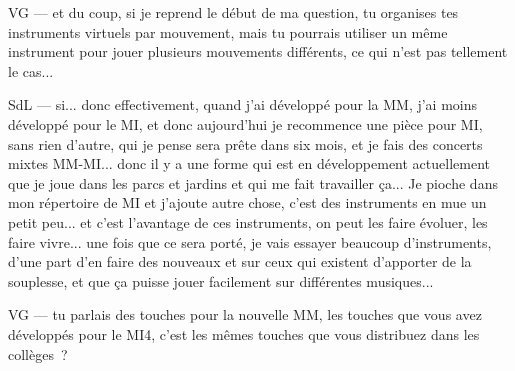 VG — et du coup, si je reprend le début de ma question, tu organises tes instruments virtuels par mouvement, mais tu pourrais utiliser un même instrument pour jouer plusieurs mouvements différents, ce qui n'est pas tellement le cas... 

SdL — si... donc effectivement, quand j'ai développé pour la MM, j'ai moins développé pour le MI, et donc aujourd'hui je recommence une pièce pour MI, sans rien d'autre, qui je pense sera prête dans six mois, et je fais des concerts mixtes MM-MI... donc il y a une forme qui est en développement actuellement que je joue dans les parcs et jardins et qui me fait travailler ça... Je pioche dans mon répertoire de MI et j'ajoute autre chose, c'est des instruments en mue un petit peu... et c'est l'avantage de ces instruments, on peut les faire évoluer, les faire vivre... une fois que ce sera porté, je vais essayer beaucoup d'instruments, d'une part d'en faire des nouveaux et sur ceux qui existent d'apporter de la souplesse, et que ça puisse jouer facilement sur différentes musiques... 

VG — tu parlais des touches pour la nouvelle MM, les touches que vous avez développés pour le MI4, c'est les mêmes touches que vous distribuez dans les collèges ? 


